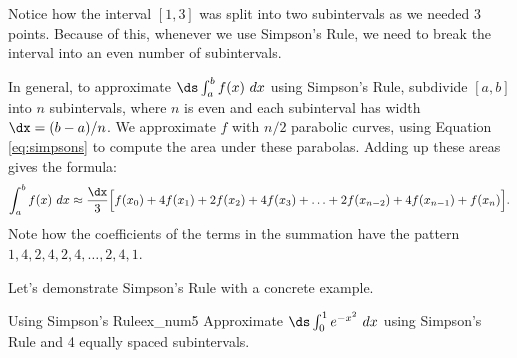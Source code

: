 
Notice how the interval $[1,3]$ was split into two subintervals as we needed 3 points. Because of this, whenever we use Simpson's Rule, we need to break the interval into an even number of subintervals. 

In general, to approximate $\ds \int_a^b f(x)\ dx$ using Simpson's Rule, subdivide $[a,b]$ into $n$ subintervals, where $n$ is even and each subinterval has width $\dx = (b-a)/n$. We approximate $f$ with $n/2$ parabolic curves, using Equation \eqref{eq:simpsons} to compute the area under these parabolas. Adding up these areas gives the formula:
$$\int_a^b f(x) \ dx \approx \frac{\dx}3\Big[f(x_0)+4f(x_1)+2f(x_2)+4f(x_3)+\ldots+2f(x_{n-2})+4f(x_{n-1})+f(x_{n})\Big].$$
Note how the coefficients of the terms in the summation have the pattern $ 1, 4, 2, 4, 2, 4, \ldots , 2, 4, 1 $.

Let's demonstrate Simpson's Rule with a concrete example.\\


\begin{example}{Using Simpson's Rule}{ex_num5}{
Approximate $\ds\int_0^1 e^{-x^2}\ dx$ using Simpson's Rule and 4 equally spaced subintervals.}
\end{example}

